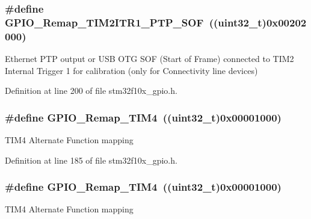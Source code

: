 \subsubsection[{\texorpdfstring{G\+P\+I\+O\+\_\+\+Remap\+\_\+\+T\+I\+M2\+I\+T\+R1\+\_\+\+P\+T\+P\+\_\+\+S\+OF}{GPIO_Remap_TIM2ITR1_PTP_SOF}}]{\setlength{\rightskip}{0pt plus 5cm}\#define G\+P\+I\+O\+\_\+\+Remap\+\_\+\+T\+I\+M2\+I\+T\+R1\+\_\+\+P\+T\+P\+\_\+\+S\+OF~(({\bf uint32\+\_\+t})0x00202000)}\hypertarget{group___g_p_i_o___remap__define_ga0dc4bec540b9372479e63295fe68ac17}{}\label{group___g_p_i_o___remap__define_ga0dc4bec540b9372479e63295fe68ac17}
Ethernet P\+TP output or U\+SB O\+TG S\+OF (Start of Frame) connected to T\+I\+M2 Internal Trigger 1 for calibration (only for Connectivity line devices) 

Definition at line 200 of file stm32f10x\+\_\+gpio.\+h.

\subsubsection[{\texorpdfstring{G\+P\+I\+O\+\_\+\+Remap\+\_\+\+T\+I\+M4}{GPIO_Remap_TIM4}}]{\setlength{\rightskip}{0pt plus 5cm}\#define G\+P\+I\+O\+\_\+\+Remap\+\_\+\+T\+I\+M4~(({\bf uint32\+\_\+t})0x00001000)}\hypertarget{group___g_p_i_o___remap__define_ga041b2f02b32895ce34bcd7499c9e873f}{}\label{group___g_p_i_o___remap__define_ga041b2f02b32895ce34bcd7499c9e873f}
T\+I\+M4 Alternate Function mapping 

Definition at line 185 of file stm32f10x\+\_\+gpio.\+h.

\subsubsection[{\texorpdfstring{G\+P\+I\+O\+\_\+\+Remap\+\_\+\+T\+I\+M4}{GPIO_Remap_TIM4}}]{\setlength{\rightskip}{0pt plus 5cm}\#define G\+P\+I\+O\+\_\+\+Remap\+\_\+\+T\+I\+M4~(({\bf uint32\+\_\+t})0x00001000)}\hypertarget{group___g_p_i_o___remap__define_ga041b2f02b32895ce34bcd7499c9e873f}{}\label{group___g_p_i_o___remap__define_ga041b2f02b32895ce34bcd7499c9e873f}
T\+I\+M4 Alternate Function mapping 

